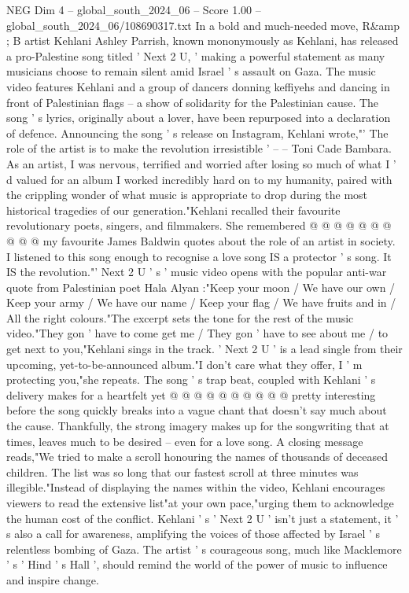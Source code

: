 \begin{textsample}{NEG Dim 4 – global\_south\_2024\_06 – Score 1.00 – global\_south\_2024\_06/108690317.txt}  \label{ex:f4_neg_371}
In a bold and much-needed move, R\&amp ; B artist Kehlani Ashley Parrish, known mononymously as Kehlani, has released a pro-Palestine song titled ' Next 2 U, ' making a powerful statement as many musicians choose to remain silent amid Israel ' s assault on Gaza.
The music video features Kehlani and a group of dancers donning keffiyehs and dancing in front of Palestinian flags -- a show of solidarity for the Palestinian cause.
The song ' s lyrics, originally about a lover, have been repurposed into a declaration of defence.
Announcing the song ' s release on Instagram, Kehlani wrote,"' The role of the artist is to make the revolution irresistible ' -- -- Toni Cade Bambara.
As an artist, I was nervous, terrified and worried after losing so much of what I ' d valued for an album I worked incredibly hard on to my humanity, paired with the crippling wonder of what music is appropriate to drop during the most historical tragedies of our generation."Kehlani recalled their favourite revolutionary poets, singers, and filmmakers.
She remembered @ @ @ @ @ @ @ @ @ @ my favourite James Baldwin quotes about the role of an artist in society.
I listened to this song enough to recognise a love song IS a protector ' s song.
It IS the revolution."' Next 2 U ' s ' music video opens with the popular anti-war quote from Palestinian poet Hala Alyan :"Keep your moon / We have our own / Keep your army / We have our name / Keep your flag / We have fruits and in / All the right colours."The excerpt sets the tone for the rest of the music video."They gon ' have to come get me / They gon ' have to see about me / to get next to you,"Kehlani sings in the track. ' Next 2 U ' is a lead single from their upcoming, yet-to-be-announced album."I don't care what they offer, I ' m protecting you,"she repeats.
The song ' s trap beat, coupled with Kehlani ' s delivery makes for a heartfelt yet @ @ @ @ @ @ @ @ @ @ pretty interesting before the song quickly breaks into a vague chant that doesn't say much about the cause.
Thankfully, the strong imagery makes up for the songwriting that at times, leaves much to be desired -- even for a love song.
A closing message reads,"We tried to make a scroll honouring the names of thousands of deceased children.
The list was so long that our fastest scroll at three minutes was illegible."Instead of displaying the names within the video, Kehlani encourages viewers to read the extensive list"at your own pace,"urging them to acknowledge the human cost of the conflict.
Kehlani ' s ' Next 2 U ' isn't just a statement, it ' s also a call for awareness, amplifying the voices of those affected by Israel ' s relentless bombing of Gaza.
The artist ' s courageous song, much like Macklemore ' s ' Hind ' s Hall ', should remind the world of the power of music to influence and inspire change.

\end{textsample}
